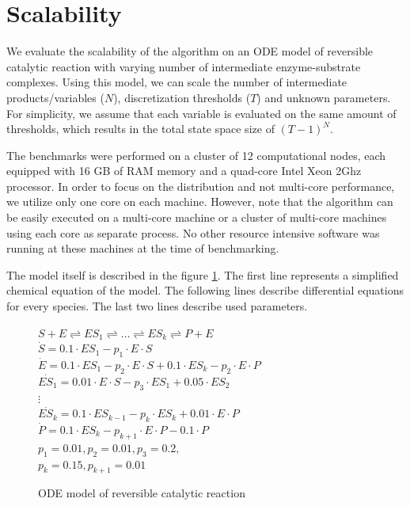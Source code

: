 \documentclass[12pt,oneside]{fithesis2}
\begin{document}
			\section{Scalability}	
				\label{sec:scale}
			
				We evaluate the scalability of the algorithm on an ODE model of reversible catalytic reaction with varying number of intermediate enzyme-substrate complexes.  Using this model, we can scale the number of intermediate products/variables ($N$), discretization thresholds ($T$) and unknown parameters. For simplicity, we assume that each variable is evaluated on the same amount of thresholds, which results in the total state space size of $(T - 1)^N$. 
				
				
				The benchmarks were performed on a cluster of 12 computational nodes, each equipped with 16 GB of RAM memory and a quad-core Intel Xeon 2Ghz processor. In order to focus on the distribution and not multi-core performance, we utilize only one core on each machine. However, note that the algorithm can be easily executed on a multi-core machine or a cluster of multi-core machines using each core as separate process. No other resource intensive software was running at these machines at the time of benchmarking.
				
				The model itself is described in the figure \ref{fig:model}. The first line represents a simplified chemical equation of the model. The following lines describe differential equations for every species. The last two lines describe used parameters. 				


				\begin{figure}
					\label{fig:model}
					\centering
					\underline{$S + E \rightleftharpoons ES_1 \rightleftharpoons \dots \rightleftharpoons ES_k \rightleftharpoons P + E$}\\
					$\dot{S}  =  0.1\cdot ES_1 - p_1\cdot E\cdot S$\\
					$\dot{E}  =  0.1\cdot ES_1 - p_2\cdot E\cdot S + 0.1\cdot ES_k - p_2\cdot E\cdot P$\\
					$\dot{ES_1} = 0.01\cdot E\cdot S - p_3\cdot ES_1 + 0.05\cdot ES_2$\\
					$\vdots $\\
					$\dot{ES_k} = 0.1\cdot ES_{k -1} - p_k\cdot ES_k + 0.01\cdot E\cdot P$\\
					\underline{$\dot{P}  =  0.1\cdot ES_k - p_{k+1}\cdot E\cdot P - 0.1\cdot P$}\\
					$p_1 = 0.01, p_2 = 0.01, p_3 = 0.2,$\\ $p_k = 0.15, p_{k+1} = 0.01$
					\caption{ODE model of reversible catalytic reaction}
				\end{figure}
\end{document}
